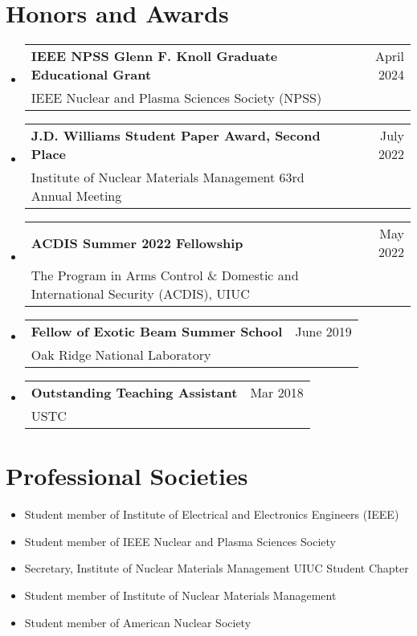 \documentclass[letterpaper,11pt]{article} %
\makeatletter
\newcommand{\CVSubheading}[4]{
  \vspace{-2pt}\item
    \begin{tabular*}{0.97\textwidth}[t]{l@{\extracolsep{\fill}}r}
      \textbf{#1} & #2 \\
      \small#3 & \small #4 \\
    \end{tabular*}\vspace{-7pt}
}
\newcommand{\CVSubHeadingListStart}{\begin{itemize}[leftmargin=0.5cm, label={}]}
\newcommand{\CVSubHeadingListEnd}{\end{itemize}}
\makeatother
\begin{document}
\section{Honors and Awards}
\CVSubHeadingListStart
    \CVSubheading
          {IEEE NPSS Glenn F. Knoll Graduate Educational Grant}{April 2024}
          {IEEE Nuclear and Plasma Sciences Society (NPSS)}{}
    \CVSubheading
          {J.D. Williams Student Paper Award, Second Place}{July 2022}
          {Institute of Nuclear Materials Management 63rd Annual Meeting}{}
    \CVSubheading
          {ACDIS Summer 2022 Fellowship}{May 2022}
          {The Program in Arms Control \& Domestic and International Security (ACDIS), UIUC}{}
    \CVSubheading
          {Fellow of Exotic Beam Summer School}{June 2019}
          {Oak Ridge National Laboratory}{}
    \CVSubheading
          {Outstanding Teaching Assistant}{Mar 2018}
          {USTC}{}
\CVSubHeadingListEnd

\section{Professional Societies}
\begin{itemize}
    \item Student member of Institute of Electrical and Electronics Engineers (IEEE)
    \item Student member of IEEE Nuclear and Plasma Sciences Society
    \item Secretary, Institute of Nuclear Materials Management UIUC Student Chapter
    \item Student member of Institute of Nuclear Materials Management
    \item Student member of American Nuclear Society
\end{itemize}
\end{document}
